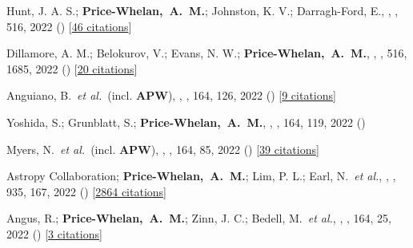 {\item[{\color{deemph}\scriptsize109}]Hunt, J. A. S.; \textbf{Price-Whelan,~A.~M.}; Johnston, K. V.; Darragh-Ford, E., , \mnras, 516, 2022 () [\href{http://adsabs.harvard.edu/abs/2022MNRAS.516L...7H}{46 citations}]

\item[{\color{deemph}\scriptsize108}]Dillamore, A. M.; Belokurov, V.; Evans, N. W.; \textbf{Price-Whelan,~A.~M.}, , \mnras, 516, 1685, 2022 () [\href{http://adsabs.harvard.edu/abs/2022MNRAS.516.1685D}{20 citations}]

\item[{\color{deemph}\scriptsize107}]Anguiano, B.~\textit{et al.}~(incl. \textbf{APW}), , \aj, 164, 126, 2022 () [\href{http://adsabs.harvard.edu/abs/2022AJ....164..126A}{9 citations}]

\item[{\color{deemph}\scriptsize106}]Yoshida, S.; Grunblatt, S.; \textbf{Price-Whelan,~A.~M.}, , \aj, 164, 119, 2022 ()

\item[{\color{deemph}\scriptsize105}]Myers, N.~\textit{et al.}~(incl. \textbf{APW}), , \aj, 164, 85, 2022 () [\href{http://adsabs.harvard.edu/abs/2022AJ....164...85M}{39 citations}]

\item[{\color{deemph}\scriptsize104}]Astropy Collaboration; \textbf{Price-Whelan,~A.~M.}; Lim, P. L.; Earl, N.~\textit{et al.}, , \apj, 935, 167, 2022 () [\href{http://adsabs.harvard.edu/abs/2022ApJ...935..167A}{2864 citations}]

\item[{\color{deemph}\scriptsize103}]Angus, R.; \textbf{Price-Whelan,~A.~M.}; Zinn, J. C.; Bedell, M.~\textit{et al.}, , \aj, 164, 25, 2022 () [\href{http://adsabs.harvard.edu/abs/2022AJ....164...25A}{3 citations}]

}

